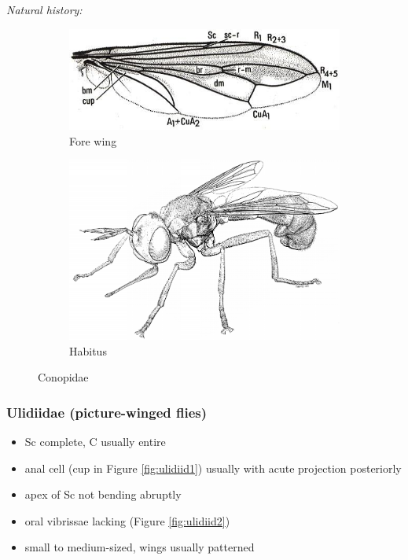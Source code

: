 \documentclass[letterpaper, 11pt]{article}
\begin{document}
\noindent{}\textit{Natural history:} \\

\begin{figure}[ht!]
    \centering
    \begin{subfigure}[ht!]{0.45\textwidth}
        \includegraphics[width=\textwidth]{ConopidWing}
        \caption{Fore wing \citep[][Fig. 4.53]{mcalpine1981manual}}
        \label{fig:conopid1}
    \end{subfigure}
    \qquad
    \begin{subfigure}[ht!]{0.45\textwidth}
        \includegraphics[width=\textwidth]{ConopidHabitus}
        \caption{Habitus \citep[][Fig. 54.1]{mcalpine1981manualv2}}
        \label{fig:conopid2}
    \end{subfigure}
    \caption{Conopidae}\label{fig:conopids}
\end{figure}

\subsubsection{Ulidiidae (picture-winged flies)}
\begin{itemize}
\item Sc complete, C usually entire
\item anal cell (cup in Figure \ref{fig:ulidiid1}) usually with acute projection posteriorly
\item apex of Sc not bending abruptly
\item oral vibrissae lacking (Figure \ref{fig:ulidiid2})
\item small to medium-sized, wings usually patterned
\end{itemize}
\end{document}
